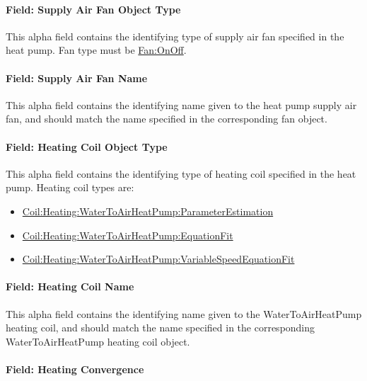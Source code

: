 \paragraph{Field: Supply Air Fan Object Type}\label{field-supply-air-fan-object-type-2}

This alpha field contains the identifying type of supply air fan specified in the heat pump. Fan type must be \hyperref[fanonoff]{Fan:OnOff}.

\paragraph{Field: Supply Air Fan Name}\label{field-supply-air-fan-name-2}

This alpha field contains the identifying name given to the heat pump supply air fan, and should match the name specified in the corresponding fan object.

\paragraph{Field: Heating Coil Object Type}\label{field-heating-coil-object-type-7}

This alpha field contains the identifying type of heating coil specified in the heat pump. Heating coil types are:

\begin{itemize}
\item
  \hyperref[coilheatingwatertoairheatpumpparameterestimation]{Coil:Heating:WaterToAirHeatPump:ParameterEstimation}
\item
  \hyperref[coilheatingwatertoairheatpumpequationfit]{Coil:Heating:WaterToAirHeatPump:EquationFit}
\item
  \hyperref[coilheatingwatertoairheatpumpvariablespeedequationfit]{Coil:Heating:WaterToAirHeat\hyperref[pumpvariablespeed]{Pump:VariableSpeed}EquationFit}
\end{itemize}

\paragraph{Field: Heating Coil Name}\label{field-heating-coil-name-7}

This alpha field contains the identifying name given to the WaterToAirHeatPump heating coil, and should match the name specified in the corresponding WaterToAirHeatPump heating coil object.

\paragraph{Field: Heating Convergence}\label{field-heating-convergence}

